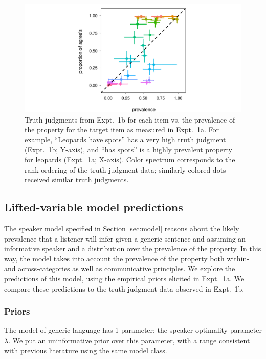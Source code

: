 \documentclass[10pt,letterpaper]{article}
\begin{document}
\begin{figure}
\centering
    \includegraphics[width=\columnwidth]{tj_n100_tjVsprev_95hdi.pdf}
    \caption{Truth judgments from Expt.~1b for each item vs. the prevalence of the property for the target item as measured in Expt.~1a. For example, ``Leopards have spots'' has a very high truth judgment (Expt.~1b; Y-axis), and ``has spots'' is a highly prevalent property for leopards (Expt.~1a; X-axis). Color spectrum corresponds to the rank ordering of the truth judgment data; similarly colored dots received similar truth judgments.}
  \label{fig:scatterprev}
\end{figure}




\subsection{Lifted-variable model predictions}

The speaker model specified in Section \ref{sec:model} reasons about the likely prevalence that a listener will infer given  a generic sentence and assuming an informative speaker and a distribution over the prevalence of the property. 
In this way, the model takes into account the prevalence of the property both within- and across-categories as well as communicative principles.
We explore the predictions of this model, using the empirical priors elicited in Expt.~1a. 
We compare these predictions to the truth judgment data observed in Expt.~1b.
\subsubsection{Priors}

The model of generic language has 1 parameter: the speaker optimality parameter $\lambda$. We put an uninformative prior over this parameter, with a range consistent with previous literature using the same model class.
\end{document}
